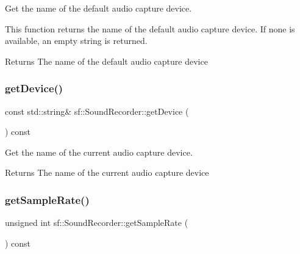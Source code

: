 Get the name of the default audio capture device. 

This function returns the name of the default audio capture device. If none is available, an empty string is returned.

\begin{DoxyReturn}{Returns}
The name of the default audio capture device \begin{DoxyVerb}\end{DoxyVerb}
 
\end{DoxyReturn}
\mbox{\label{classsf_1_1_sound_recorder_ab16cd53c6884cbf3380c017cee72ba81}} 
\subsubsection{\texorpdfstring{getDevice()}{getDevice()}}
{\footnotesize\ttfamily const std\+::string\& sf\+::\+Sound\+Recorder\+::get\+Device (\begin{DoxyParamCaption}{ }\end{DoxyParamCaption}) const}



Get the name of the current audio capture device. 

\begin{DoxyReturn}{Returns}
The name of the current audio capture device \begin{DoxyVerb}\end{DoxyVerb}
 
\end{DoxyReturn}
\mbox{\label{classsf_1_1_sound_recorder_aed292c297a3e0d627db4eb5c18f58c44}} 
\subsubsection{\texorpdfstring{getSampleRate()}{getSampleRate()}}
{\footnotesize\ttfamily unsigned int sf\+::\+Sound\+Recorder\+::get\+Sample\+Rate (\begin{DoxyParamCaption}{ }\end{DoxyParamCaption}) const}



